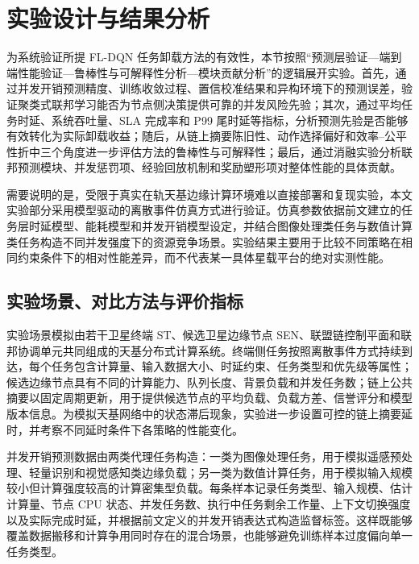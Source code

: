 
\section{实验设计与结果分析}
\label{sec:experiments}

为系统验证所提 FL-DQN 任务卸载方法的有效性，本节按照“预测层验证—端到端性能验证—鲁棒性与可解释性分析—模块贡献分析”的逻辑展开实验。首先，通过并发开销预测精度、训练收敛过程、置信校准结果和异构环境下的预测误差，验证聚类式联邦学习能否为节点侧决策提供可靠的并发风险先验；其次，通过平均任务时延、系统吞吐量、SLA 完成率和 P99 尾时延等指标，分析预测先验是否能够有效转化为实际卸载收益；随后，从链上摘要陈旧性、动作选择偏好和效率--公平性折中三个角度进一步评估方法的鲁棒性与可解释性；最后，通过消融实验分析联邦预测模块、并发惩罚项、经验回放机制和奖励塑形项对整体性能的具体贡献。

需要说明的是，受限于真实在轨天基边缘计算环境难以直接部署和复现实验，本文实验部分采用模型驱动的离散事件仿真方式进行验证。仿真参数依据前文建立的任务层时延模型、能耗模型和并发开销模型设定，并结合图像处理类任务与数值计算类任务构造不同并发强度下的资源竞争场景。实验结果主要用于比较不同策略在相同约束条件下的相对性能差异，而不代表某一具体星载平台的绝对实测性能。

\subsection{实验场景、对比方法与评价指标}
\label{subsec:exp_setup}

实验场景模拟由若干卫星终端 ST、候选卫星边缘节点 SEN、联盟链控制平面和联邦协调单元共同组成的天基分布式计算系统。终端侧任务按照离散事件方式持续到达，每个任务包含计算量、输入数据大小、时延约束、任务类型和优先级等属性；候选边缘节点具有不同的计算能力、队列长度、背景负载和并发任务数；链上公共摘要以固定周期更新，用于提供候选节点的平均负载、负载方差、信誉评分和模型版本信息。为模拟天基网络中的状态滞后现象，实验进一步设置可控的链上摘要延时，并考察不同延时条件下各策略的性能变化。

并发开销预测数据由两类代理任务构造：一类为图像处理任务，用于模拟遥感预处理、轻量识别和视觉感知类边缘负载；另一类为数值计算任务，用于模拟输入规模较小但计算强度较高的计算密集型负载。每条样本记录任务类型、输入规模、估计计算量、节点 CPU 状态、并发任务数、执行中任务剩余工作量、上下文切换强度以及实际完成时延，并根据前文定义的并发开销表达式构造监督标签。这样既能够覆盖数据搬移和计算争用同时存在的混合场景，也能够避免训练样本过度偏向单一任务类型。

